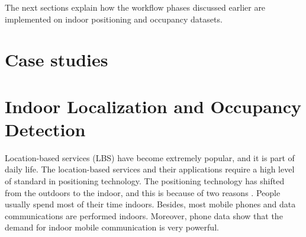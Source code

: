 \documentclass[../UNBThesis2.tex]{subfiles}
\begin{document}

    




The next sections explain how the workflow phases discussed earlier are implemented on indoor positioning and occupancy datasets. 



\section{Case studies}

\section{Indoor Localization  and Occupancy Detection}

Location-based services (LBS) have become extremely popular, and it is part of daily life. The location-based services and their applications require a high level of standard in positioning technology. The positioning technology has shifted from the outdoors to the indoor, and this is because of two reasons \cite{xia2017indoor}. People usually spend most of their time indoors. Besides, most mobile phones and data communications are performed indoors. Moreover, phone data show that the demand for indoor mobile communication is very powerful. 
\end{document}
